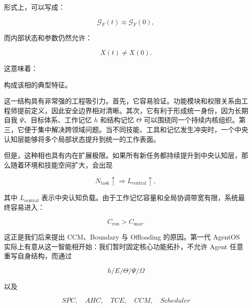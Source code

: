 形式上，可以写成：

\begin{equation}
\mathcal{G}_{F}(t)
\approx
\mathcal{G}_{F}(0),
\end{equation}

而内部状态和参数仍然允许：

\begin{equation}
X(t)\neq X(0).
\end{equation}

这意味着：

\begin{statementbox}
\centering
{}
\end{statementbox}

构成该相的典型特征。

这一结构具有非常强的工程吸引力。首先，它容易验证。功能模块和权限关系由工程师提前定义，因此安全边界相对清晰。其次，它有利于形成统一身份，因为长期自我 $\Psi$、目标体系、工作记忆 $h$ 和结构记忆 $\Theta$ 可以围绕同一个持续内核组织。第三，它便于集中解决跨领域问题。当不同技能、工具和记忆发生冲突时，一个中央认知层能够将多个局部状态提升到统一的工作表面。

但是，这种相也具有内在扩展极限。如果所有新任务都持续提升到中央认知层，那么随着环境和技能空间扩大，会出现

\begin{equation}
N_{\mathrm{task}}\uparrow
\Rightarrow
L_{\mathrm{central}}\uparrow,
\end{equation}

其中 $L_{\mathrm{central}}$ 表示中央认知负载。由于工作记忆容量和全局协调带宽有限，系统最终容易进入：

\begin{equation}
C_{\mathrm{run}}
>
C_{\max}.
\end{equation}

这正是我们后来提出 CCM、Boundary 与 Offloading 的原因。第一代 AgentOS 实际上有意从这一智能相开始：我们暂时固定核心功能拓扑，不允许 Agent 任意重写自身结构，而通过

\begin{equation}
h/E/\Theta/\Psi/\Omega
\end{equation}

以及

\begin{equation}
SPC,\quad AHC,\quad TCE,\quad CCM,\quad Scheduler
\end{equation}

